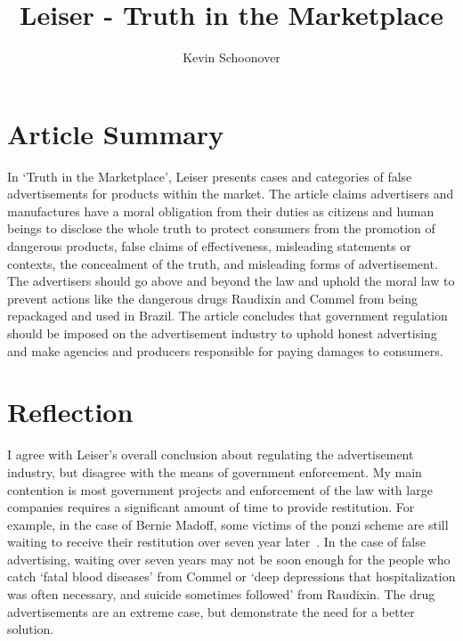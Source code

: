 \documentclass[12pt]{article}
\begin{document}
\title{Leiser - Truth in the Marketplace}
\author{Kevin Schoonover}

\maketitle

\section{Article Summary}
In `Truth in the Marketplace', Leiser presents cases and categories of false
advertisements for products within the market. The article claims advertisers and
manufactures have a moral obligation from their duties as citizens and human
beings to disclose the whole truth to protect consumers from the promotion of
dangerous products, false claims of effectiveness, misleading statements or
contexts, the concealment of the truth, and misleading forms of advertisement.
The advertisers should go above and beyond the law and uphold the moral law to
prevent actions like the dangerous drugs Raudixin and Commel from being
repackaged and used in Brazil. The article concludes that government regulation
should be imposed on the advertisement industry to uphold honest advertising and
make agencies and producers responsible for paying damages to consumers.

\section{Reflection}
I agree with Leiser's overall conclusion about regulating the advertisement
industry, but disagree with the means of government enforcement. My main
contention is most government projects and enforcement of the law with large
companies requires a significant amount of time to provide restitution.  For
example, in the case of Bernie Madoff, some victims of the ponzi scheme are
still waiting to receive their restitution over seven year later~\cite{madoff}.
In the case of false advertising, waiting over seven years may not be soon
enough for the people who catch `fatal blood diseases' from Commel or `deep
depressions that hospitalization was often necessary, and suicide sometimes
followed' from Raudixin. The drug advertisements are an extreme case, but
demonstrate the need for a better solution.
\end{document}
